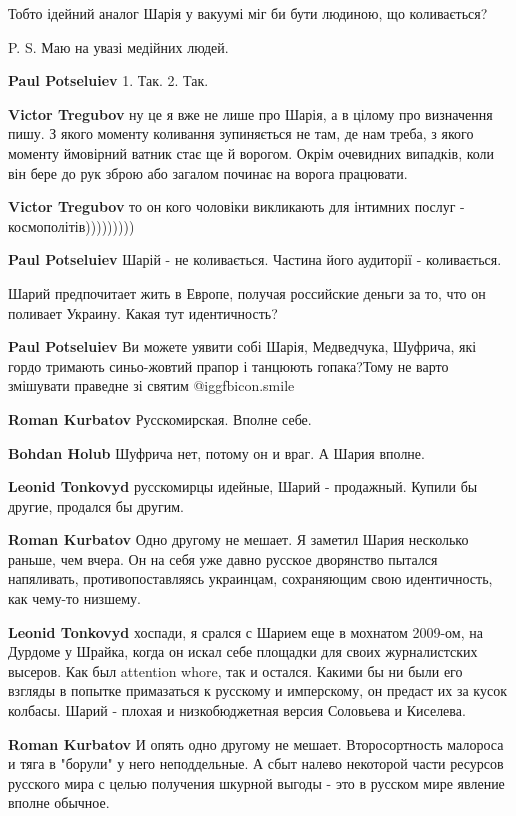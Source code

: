 \begin{itemize}
\begin{itemize}
Тобто ідейний аналог Шарія у вакуумі міг би бути людиною, що коливається?

P. S. Маю на увазі медійних людей.

\textbf{Paul Potseluiev} 1. Так. 2. Так.

\textbf{Victor Tregubov} ну це я вже не лише про Шарія, а в цілому про визначення пишу.
З якого моменту коливання зупиняється не там, де нам треба, з якого моменту ймовірний ватник стає ще й ворогом.
Окрім очевидних випадків, коли він бере до рук зброю або загалом починає на ворога працювати.

\textbf{Victor Tregubov} то он кого чоловіки викликають для інтимних послуг - космополітів)))))))))

\textbf{Paul Potseluiev} Шарій - не коливається. Частина його аудиторії - коливається.

Шарий предпочитает жить в Европе, получая российские деньги за то, что он поливает Украину. Какая тут идентичность?

\textbf{Paul Potseluiev} Ви можете уявити собі Шарія, Медведчука, Шуфрича, які гордо тримають синьо-жовтий прапор і танцюють гопака?Тому не варто змішувати праведне зі святим  @igg{fbicon.smile} 

\textbf{Roman Kurbatov} Русскомирская.
Вполне себе.

\textbf{Bohdan Holub} Шуфрича нет, потому он и враг. А Шария вполне.

\textbf{Leonid Tonkovyd} русскомирцы идейные, Шарий - продажный. Купили бы другие, продался бы другим.

\textbf{Roman Kurbatov} Одно другому не мешает. Я заметил Шария несколько раньше, чем вчера. Он на себя уже давно русское дворянство пытался напяливать, противопоставляясь украинцам, сохраняющим свою идентичность, как чему-то низшему.

\textbf{Leonid Tonkovyd} хоспади, я срался с Шарием еще в мохнатом 2009-ом, на Дурдоме у Шрайка, когда он искал себе площадки для своих журналистских высеров. Как был attention whore, так и остался. Какими бы ни были его взгляды в попытке примазаться к русскому и имперскому, он предаст их за кусок колбасы. Шарий - плохая и низкобюджетная версия Соловьева и Киселева.

\textbf{Roman Kurbatov} И опять одно другому не мешает. Второсортность малороса и тяга в "борули" у него неподдельные. А сбыт налево некоторой части ресурсов русского мира с целью получения шкурной выгоды - это в русском мире явление вполне обычное.


\end{itemize}
\end{itemize}
